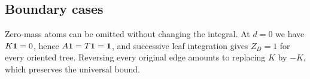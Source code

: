 \subsection{Boundary cases}
Zero-mass atoms can be omitted without changing the integral. At $d=0$
we have $K\mathbf1=0$, hence $A\mathbf1=T\mathbf1=\mathbf1$, and successive leaf
integration gives $Z_D=1$ for every oriented tree. Reversing every
original edge amounts to replacing $K$ by $-K$, which preserves the
universal bound.
